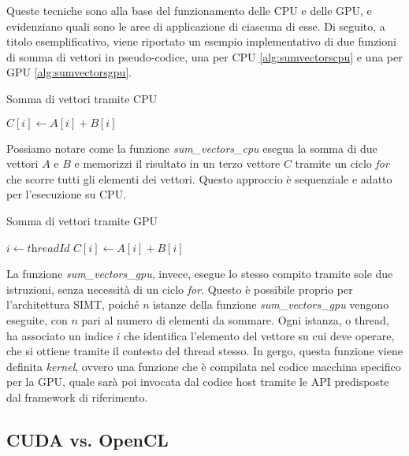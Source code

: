 \vspace{1em}

Queste tecniche sono alla base del funzionamento delle CPU e delle GPU, e
evidenziano quali sono le aree di applicazione di ciascuna di esse. Di seguito,
a titolo esemplificativo, viene riportato un esempio implementativo di due funzioni
di somma di vettori in pseudo-codice, una per CPU \ref{alg:sumvectorscpu} e una
per GPU \ref{alg:sumvectorsgpu}.

\begin{algorithm}
  \caption{Somma di vettori tramite CPU}
  \label{alg:sumvectorscpu}
  \begin{algorithmic}
      \State
    $C[i] \gets A[i] + B[i]$ \EndFor \EndFunction
  \end{algorithmic}
\end{algorithm}

Possiamo notare come la funzione \textit{sum\_vectors\_cpu} esegua la somma di
due vettori $A$ e $B$ e memorizzi il risultato in un terzo vettore $C$ tramite
un ciclo \textit{for} che scorre tutti gli elementi dei vettori. Questo
approccio è sequenziale e adatto per l'esecuzione su CPU.

\begin{algorithm}
  \caption{Somma di vettori tramite GPU}
  \label{alg:sumvectorsgpu}
  \begin{algorithmic}
     \State $i \gets \textit{threadId}$ \State
    $C[i] \gets A[i] + B[i]$ \EndFunction
  \end{algorithmic}
\end{algorithm}

La funzione \textit{sum\_vectors\_gpu}, invece, esegue lo stesso compito tramite
sole due istruzioni, senza necessità di un ciclo \textit{for}. Questo è possibile
proprio per l'architettura SIMT, poiché $n$ istanze della funzione \textit{sum\_vectors\_gpu}
vengono eseguite, con $n$ pari al numero di elementi da sommare. Ogni istanza, o
thread, ha associato un indice $i$ che identifica l'elemento del vettore su cui deve
operare, che si ottiene tramite il contesto del thread stesso. In gergo, questa
funzione viene definita \textit{kernel}, ovvero una funzione che è compilata nel
codice macchina specifico per la GPU, quale sarà poi invocata dal codice host tramite
le API predisposte dal framework di riferimento.

\subsection{CUDA vs. OpenCL}
\label{subsec:cudavsopencl}

